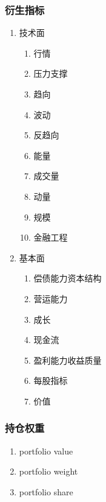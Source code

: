 \documentclass[11pt]{article}
\begin{document}
\subsubsection{衍生指标}
\label{sec:orgheadline48}
\begin{enumerate}
\item 技术面
\label{sec:orgheadline39}
\begin{enumerate}
\item 行情
\label{sec:orgheadline29}
\item 压力支撑
\label{sec:orgheadline30}
\item 趋向
\label{sec:orgheadline31}
\item 波动
\label{sec:orgheadline32}
\item 反趋向
\label{sec:orgheadline33}
\item 能量
\label{sec:orgheadline34}
\item 成交量
\label{sec:orgheadline35}
\item 动量
\label{sec:orgheadline36}
\item 规模
\label{sec:orgheadline37}
\item 金融工程
\label{sec:orgheadline38}
\end{enumerate}
\item 基本面
\label{sec:orgheadline47}
\begin{enumerate}
\item 偿债能力资本结构
\label{sec:orgheadline40}
\item 营运能力
\label{sec:orgheadline41}
\item 成长
\label{sec:orgheadline42}
\item 现金流
\label{sec:orgheadline43}
\item 盈利能力收益质量
\label{sec:orgheadline44}
\item 每股指标
\label{sec:orgheadline45}
\item 价值
\label{sec:orgheadline46}
\end{enumerate}
\end{enumerate}
\subsubsection{持仓权重}
\label{sec:orgheadline52}
\begin{enumerate}
\item portfolio value
\label{sec:orgheadline49}
\item portfolio weight
\label{sec:orgheadline50}
\item portfolio share
\label{sec:orgheadline51}
\end{enumerate}
\end{document}

